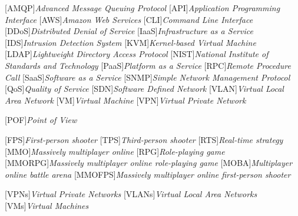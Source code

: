 \begin{acronym}[]
	[AMQP]{{\it Advanced Message Queuing Protocol}}
	[API]{{\it Application Programming Interface}}
    [AWS]{{\it Amazon Web Services}}
	[CLI]{{\it Command Line Interface}}
	[DDoS]{{\it Distributed Denial of Service}}
	[IaaS]{{\it Infrastructure as a Service}}
    [IDS]{{\it Intrusion Detection System}}
	[KVM]{{\it Kernel-based Virtual Machine}}
    [LDAP]{{\it Lightweight Directory Access Protocol}}
	[NIST]{{\it National Institute of Standards and Technology}}
	[PaaS]{{\it Platform as a Service}}
    [RPC]{{\it Remote Procedure Call}}
	[SaaS]{{\it Software as a Service}}
	[SNMP]{{\it Simple Network Management Protocol}}
	[QoS]{{\it Quality of Service}}
	[SDN]{{\it Software Defined Network}}
	[VLAN]{{\it Virtual Local Area Network}}
	[VM]{{\it Virtual Machine}}
	[VPN]{{\it Virtual Private Network}}

	[POF]{{\it Point of View}}

	[FPS]{{\it First-person shooter}}
	[TPS]{{\it Third-person shooter}}
	[RTS]{{\it Real-time strategy}}
	[MMO]{{\it Massively multiplayer online}}
	[RPG]{{\it Role-playing game}}
	[MMORPG]{{\it Massively multiplayer online role-playing game}}
	[MOBA]{{\it Multiplayer online battle arena}}
	[MMOFPS]{{\it Massively multiplayer online first-person shooter}}

	[VPNs]{{\it Virtual Private Networks}}
	[VLANs]{{\it Virtual Local Area Networks}}
	[VMs]{{\it Virtual Machines}}
\end{acronym}

